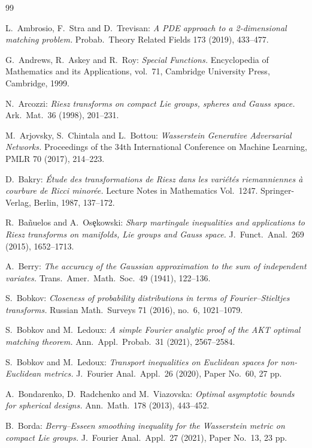 \documentclass[11pt,a4paper]{article}
\theoremstyle{definition}
\begin{document}
\begin{thebibliography}{99}
\footnotesize{

 L.\ Ambrosio, F.\ Stra and D.\ Trevisan: \textit{A PDE approach to a 2-dimensional matching problem.} Probab.\ Theory Related Fields 173 (2019), 433--477.

 G.\ Andrews, R.\ Askey and R.\ Roy: \textit{Special Functions.} Encyclopedia of Mathematics and its Applications, vol.\ 71, Cambridge University Press, Cambridge, 1999.

 N.\ Arcozzi: \textit{Riesz transforms on compact Lie groups, spheres and Gauss space.} Ark.\ Mat.\ 36 (1998), 201--231.

 M.\ Arjovsky, S.\ Chintala and L.\ Bottou: \textit{Wasserstein Generative Adversarial Networks.} Proceedings of the 34th International Conference on Machine Learning, PMLR 70 (2017), 214--223.

 D.\ Bakry: \textit{\'Etude des transformations de Riesz dans les vari\'et\'es riemanniennes \`a courbure de Ricci minor\'ee.} Lecture Notes in Mathematics Vol.\ 1247. Springer-Verlag, Berlin, 1987, 137--172.

 R.\ Ba\~{n}uelos and A.\ Os\c{e}kowski: \textit{Sharp martingale inequalities and applications to Riesz transforms on manifolds, Lie groups and Gauss space.} J.\ Funct.\ Anal.\ 269 (2015), 1652--1713.

 A.\ Berry: \textit{The accuracy of the Gaussian approximation to the sum of independent variates.} Trans.\ Amer.\ Math.\ Soc.\ 49 (1941), 122--136.

 S.\ Bobkov: \textit{Closeness of probability distributions in terms of Fourier--Stieltjes transforms.} Russian Math.\ Surveys 71 (2016), no.\ 6, 1021--1079.

 S.\ Bobkov and M.\ Ledoux: \textit{A simple Fourier analytic proof of the AKT optimal matching theorem.} Ann.\ Appl.\ Probab.\ 31 (2021), 2567--2584.

 S.\ Bobkov and M.\ Ledoux: \textit{Transport inequalities on Euclidean spaces for non-Euclidean metrics.} J.\ Fourier Anal.\ Appl.\ 26 (2020), Paper No.\ 60, 27 pp.

 A.\ Bondarenko, D.\ Radchenko and M.\ Viazovska: \textit{Optimal asymptotic bounds for spherical designs.} Ann.\ Math.\ 178 (2013), 443--452.

 B.\ Borda: \textit{Berry--Esseen smoothing inequality for the Wasserstein metric on compact Lie groups.} J.\ Fourier Anal.\ Appl.\ 27 (2021), Paper No.\ 13, 23 pp.

}
\end{thebibliography}
\end{document}

